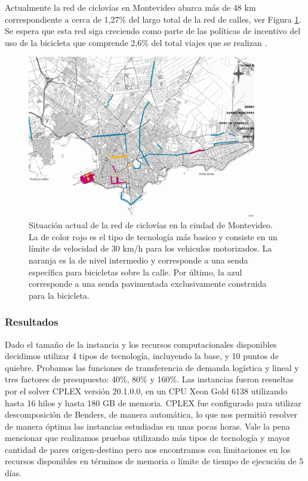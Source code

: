 \documentclass{article}
\begin{document}
  Actualmente la red de ciclovías en Montevideo abarca más de 48 km correspondiente a cerca de 1,27\% del largo total de la red de calles, ver Figura \ref{fig:montevideobikeways}. Se espera que esta red siga creciendo como parte de las políticas de incentivo del uso de la bicicleta que comprende 2,6\% del total viajes que se realizan \cite{Mauttone2017a}.

  \begin{figure}[h!]
    \centering
    \includegraphics[width=10cm]{../resources/bicicircuitos_montevideo.png}
    \caption{Situación actual de la red de ciclovías en la ciudad de Montevideo. La de color rojo es el tipo de tecnología más basico y consiste en un límite de velocidad de 30 km/h para los vehiculos motorizados. La naranja es la de nivel intermedio y corresponde a una senda específica para bicicletas sobre la calle. Por último, la azul corresponde a una senda pavimentada exclusivamente construida para la bicicleta.}
    \label{fig:montevideobikeways}
  \end{figure}

  \subsubsection{Resultados}

  Dado el tamaño de la instancia y los recursos computacionales disponibles decidimos utilizar 4 tipos de tecnología, incluyendo la base, y 10 puntos de quiebre. Probamos las funciones de transferencia de demanda logística y lineal y tres factores de presupuesto: 40\%, 80\% y 160\%. Las instancias fueron resueltas por el solver CPLEX versión 20.1.0.0, en un CPU Xeon Gold 6138 utilizando hasta 16 hilos y hasta 180 GB de memoria. CPLEX fue configurado para utilizar descomposición de Benders, de manera automática, lo que nos permitió resolver de manera óptima las instancias estudiadas en unas pocas horas. Vale la pena mencionar que realizamos pruebas utilizando más tipos de tecnología y mayor cantidad de pares origen-destino pero nos encontramos con limitaciones en los recursos disponibles en términos de memoria o límite de tiempo de ejecución de 5 días.
\end{document}
